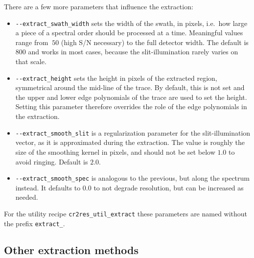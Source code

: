 
There are a few more parameters that influence the extraction:
\begin{itemize}
    \item \verb!--extract_swath_width! sets the width of the swath, in pixels,
    i.e.~how large a piece of a spectral order should be processed at a time.
    Meaningful values range from $~50$ (high S/N necessary) to the full detector
    width. The default is $800$ and works in most cases, because the
    slit-illumination rarely varies on that scale.
    \item \verb!--extract_height! sets the height in pixels of the extracted
    region, symmetrical around the mid-line of the trace. By default, this is
    not set and the upper and lower edge polynomials of the trace are used to
    set the height. Setting this parameter therefore overrides the role of the
    edge polynomials in the extraction.
    \item \verb!--extract_smooth_slit! is a regularization parameter for the
    slit-illumination vector, as it is approximated during the extraction. The
    value is roughly the size of the smoothing kernel in pixels, and should not
    be set below $1.0$ to avoid ringing. Default is $2.0$.
    \item \verb!--extract_smooth_spec! is analogous to the previous, but along
    the spectrum instead. It defaults to $0.0$ to not degrade resolution, but
    can be increased as needed.
\end{itemize}

For the utility recipe \verb!cr2res_util_extract! these parameters are named
without the prefix \verb!extract_!.

\subsection{Other extraction methods}
\label{sec:otherextr}

